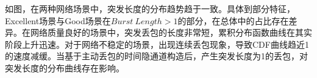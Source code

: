 
如图，在两种网络场景中，突发长度的分布趋势趋于一致。具体到部分特征，Excellent场景与Good场景在$Burst\ Length > 1$的部分，在总体中的占比存在差异。在网络质量良好的场景中，突发丢包的长度非常短，累积分布函数曲线在其实阶段上升迅速。对于网络不稳定的场景，出现连续丢包现象，导致CDF曲线趋近1的速度减缓。当基于主动丢包的时间隐通道构造后，产生突发长度为1的丢包，对突发长度的分布曲线存在影响。